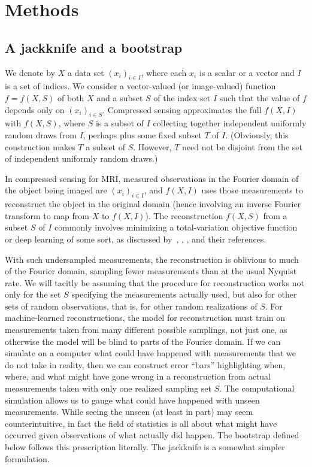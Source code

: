 \documentclass[article]{jdssv}
\begin{document}
\section{Methods}
\label{methods}


\subsection{A jackknife and a bootstrap}
We denote by $X$ a data set $(x_i)_{i \in I}$,
where each $x_i$ is a scalar or a vector and $I$ is a set of indices.
We consider a vector-valued (or image-valued) function $f = f(X, S)$
of both $X$ and a subset $S$ of the index set $I$
such that the value of $f$ depends only on $(x_i)_{i \in S}$.
Compressed sensing approximates the full $f(X, I)$ with $f(X, S)$,
where $S$ is a subset of $I$ collecting together independent uniformly random
draws from $I$, perhaps plus some fixed subset $T$ of $I$.
(Obviously, this construction makes $T$ a subset of $S$. However,
$T$ need not be disjoint from the set of independent uniformly random draws.)

In compressed sensing for MRI, measured observations in the Fourier domain
of the object being imaged are $(x_i)_{i \in I}$, and $f(X, I)$ uses those
measurements to reconstruct the object in the original domain
(hence involving an inverse Fourier transform to map from $X$ to $f(X, I)$).
The reconstruction $f(X, S)$ from a subset $S$ of $I$ commonly involves
minimizing a total-variation objective function or deep learning of some sort,
as discussed by~\citet{tao-yang}, \citet{yang-zhang},
\citet{hammernik-klatzer-kobler-recht-sodickson-pock-knoll},
and their references.

With such undersampled measurements, the reconstruction is oblivious to much
of the Fourier domain, sampling fewer measurements
than at the usual Nyquist rate.
We will tacitly be assuming that the procedure for reconstruction works
not only for the set $S$ specifying the measurements actually used,
but also for other sets of random observations, that is,
for other random realizations of $S$.
For machine-learned reconstructions, the model for reconstruction must train
on measurements taken from many different possible samplings, not just one,
as otherwise the model will be blind to parts of the Fourier domain.
If we can simulate on a computer what could have happened with measurements
that we do not take in reality, then we can construct error ``bars''
highlighting when, where, and what might have gone wrong in a reconstruction
from actual measurements taken with only one realized sampling set $S$.
The computational simulation allows us to gauge what could have happened
with unseen measurements.
While seeing the unseen (at least in part) may seem counterintuitive,
in fact the field of statistics is all about what might have occurred
given observations of what actually did happen.
The bootstrap defined below follows this prescription literally.
The jackknife is a somewhat simpler formulation.
\end{document}
